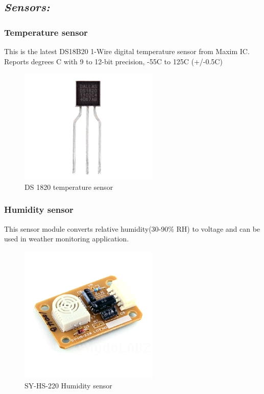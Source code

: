\documentclass{report}
\begin{document}
\subsection*{\emph{Sensors:}}
\subsubsection{Temperature sensor}
This is the latest DS18B20 1-Wire digital temperature sensor from Maxim IC. Reports degrees C with 9 to 12-bit precision, -55C to 125C (+/-0.5C)
\begin{figure}[h!]
\centering
\includegraphics[scale=0.5]{ds1820}
\caption{DS 1820 temperature sensor}
\label{fig26}
\end{figure}
\FloatBarrier

\subsubsection{Humidity sensor}
 This sensor module converts relative humidity(30-90\% RH) to voltage and can be used in weather monitoring application.
\begin{figure}[h!]
\centering
\includegraphics[scale=0.5]{humidity.jpg}
\caption{SY-HS-220 Humidity sensor}
\label{fig27}
\end{figure}
\end{document}
